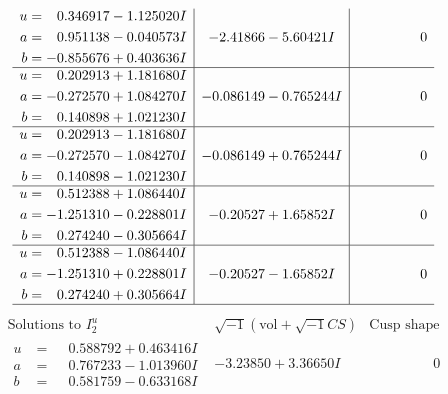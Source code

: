 \documentclass[1p]{elsarticle_modified}
\theoremstyle{definition}
\newcommand{\I}{\sqrt{-1}}
\begin{document}
$$\begin{array}{c|c|c}
\begin{aligned}
u &= \phantom{-}0.346917 - 1.125020 I \\
a &= \phantom{-}0.951138 - 0.040573 I \\
b &= -0.855676 + 0.403636 I\end{aligned}
 & -2.41866 - 5.60421 I & \phantom{-0.000000 } 0 \\ \hline\begin{aligned}
u &= \phantom{-}0.202913 + 1.181680 I \\
a &= -0.272570 + 1.084270 I \\
b &= \phantom{-}0.140898 + 1.021230 I\end{aligned}
 & -0.086149 - 0.765244 I & \phantom{-0.000000 } 0 \\ \hline\begin{aligned}
u &= \phantom{-}0.202913 - 1.181680 I \\
a &= -0.272570 - 1.084270 I \\
b &= \phantom{-}0.140898 - 1.021230 I\end{aligned}
 & -0.086149 + 0.765244 I & \phantom{-0.000000 } 0 \\ \hline\begin{aligned}
u &= \phantom{-}0.512388 + 1.086440 I \\
a &= -1.251310 - 0.228801 I \\
b &= \phantom{-}0.274240 - 0.305664 I\end{aligned}
 & -0.20527 + 1.65852 I & \phantom{-0.000000 } 0 \\ \hline\begin{aligned}
u &= \phantom{-}0.512388 - 1.086440 I \\
a &= -1.251310 + 0.228801 I \\
b &= \phantom{-}0.274240 + 0.305664 I\end{aligned}
 & -0.20527 - 1.65852 I & \phantom{-0.000000 } 0\\
 \hline 
 \end{array}$$\newpage$$\begin{array}{c|c|c}  
\text{Solutions to }I^u_{2}& \I (\text{vol} + \sqrt{-1}CS) & \text{Cusp shape}\\
 \hline 
\begin{aligned}
u &= \phantom{-}0.588792 + 0.463416 I \\
a &= \phantom{-}0.767233 - 1.013960 I \\
b &= \phantom{-}0.581759 - 0.633168 I\end{aligned}
 & -3.23850 + 3.36650 I & \phantom{-0.000000 } 0 \\ \hline\begin{aligned}

\end{aligned}
\end{array}$$
\end{document}
